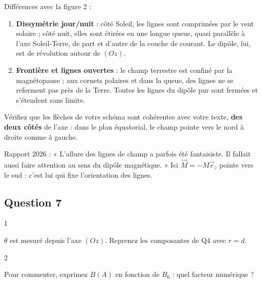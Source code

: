 \documentclass[11pt,a4paper]{article}
\providecommand{\tightlist}{\setlength{\itemsep}{0pt}\setlength{\parskip}{0pt}}
\begin{document}
Différences avec la figure 2 :

\begin{enumerate}
\def\labelenumi{\arabic{enumi}.}
\tightlist
\item
  \textbf{Dissymétrie jour/nuit} : côté Soleil, les lignes sont comprimées par le vent solaire ; côté nuit, elles sont étirées en une longue queue, quasi parallèle à l'axe Soleil-Terre, de part et d'autre de la couche de courant. Le dipôle, lui, est de révolution autour de \((Oz)\).
\item
  \textbf{Frontière et lignes ouvertes} : le champ terrestre est confiné par la magnétopause ; aux cornets polaires et dans la queue, des lignes ne se referment pas près de la Terre. Toutes les lignes du dipôle pur sont fermées et s'étendent sans limite.
\end{enumerate}

\begin{piege}

Vérifiez que les flèches de votre schéma sont cohérentes avec votre texte, \textbf{des deux côtés} de l'axe : dans le plan équatorial, le champ pointe vers le nord à droite comme à gauche.

\end{piege}

\begin{jury}

Rapport 2026 : « L'allure des lignes de champ a parfois été fantaisiste. Il fallait aussi faire attention au sens du dipôle magnétique. » Ici \(\vec M=-M\vec e_z\) pointe vers le sud : c'est lui qui fixe l'orientation des lignes.

\end{jury}

\hypertarget{question-7}{%
\subsection{Question 7}\label{question-7}}

\begin{indication}{1}

\(\theta\) est mesuré depuis l'axe \((Oz)\). Reprenez les composantes de Q4 avec \(r=d\).

\end{indication}

\begin{indication}{2}

Pour commenter, exprimez \(B(A)\) en fonction de \(B_0\) : quel facteur numérique ?

\end{indication}
\end{document}
